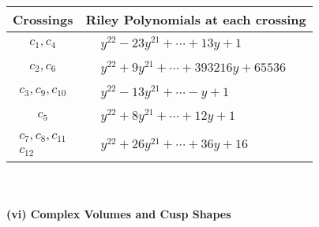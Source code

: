 \documentclass[1p]{elsarticle_modified}
\theoremstyle{definition}
\begin{document}
\begin{tabular}{m{50pt}|m{274pt}}
Crossings & \hspace{64pt}Riley Polynomials at each crossing \\
\hline $$\begin{aligned}c_{1},c_{4}\end{aligned}$$&$\begin{aligned}
&y^{22}-23 y^{21}+\cdots+13 y+1
\end{aligned}$\\
\hline $$\begin{aligned}c_{2},c_{6}\end{aligned}$$&$\begin{aligned}
&y^{22}+9 y^{21}+\cdots+393216 y+65536
\end{aligned}$\\
\hline $$\begin{aligned}c_{3},c_{9},c_{10}\end{aligned}$$&$\begin{aligned}
&y^{22}-13 y^{21}+\cdots- y+1
\end{aligned}$\\
\hline $$\begin{aligned}c_{5}\end{aligned}$$&$\begin{aligned}
&y^{22}+8 y^{21}+\cdots+12 y+1
\end{aligned}$\\
\hline $$\begin{aligned}c_{7},c_{8},c_{11}\\c_{12}\end{aligned}$$&$\begin{aligned}
&y^{22}+26 y^{21}+\cdots+36 y+16
\end{aligned}$\\
\hline
\end{tabular}\\~\\
\newpage\flushleft \textbf{(vi) Complex Volumes and Cusp Shapes}
\end{document}
